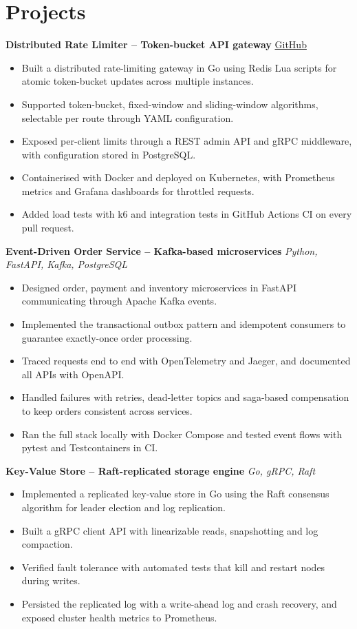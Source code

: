 \documentclass[10pt,a4paper]{article}
\begin{document}
\section*{Projects}
\textbf{Distributed Rate Limiter -- Token-bucket API gateway} \hfill \href{https://github.com/example/rate-limiter}{GitHub}
\begin{itemize}
    \item Built a distributed rate-limiting gateway in Go using Redis Lua scripts for atomic token-bucket updates across multiple instances.
    \item Supported token-bucket, fixed-window and sliding-window algorithms, selectable per route through YAML configuration.
    \item Exposed per-client limits through a REST admin API and gRPC middleware, with configuration stored in PostgreSQL.
    \item Containerised with Docker and deployed on Kubernetes, with Prometheus metrics and Grafana dashboards for throttled requests.
    \item Added load tests with k6 and integration tests in GitHub Actions CI on every pull request.
\end{itemize}

\textbf{Event-Driven Order Service -- Kafka-based microservices} \hfill \textit{Python, FastAPI, Kafka, PostgreSQL}
\begin{itemize}
    \item Designed order, payment and inventory microservices in FastAPI communicating through Apache Kafka events.
    \item Implemented the transactional outbox pattern and idempotent consumers to guarantee exactly-once order processing.
    \item Traced requests end to end with OpenTelemetry and Jaeger, and documented all APIs with OpenAPI.
    \item Handled failures with retries, dead-letter topics and saga-based compensation to keep orders consistent across services.
    \item Ran the full stack locally with Docker Compose and tested event flows with pytest and Testcontainers in CI.
\end{itemize}

\textbf{Key-Value Store -- Raft-replicated storage engine} \hfill \textit{Go, gRPC, Raft}
\begin{itemize}
    \item Implemented a replicated key-value store in Go using the Raft consensus algorithm for leader election and log replication.
    \item Built a gRPC client API with linearizable reads, snapshotting and log compaction.
    \item Verified fault tolerance with automated tests that kill and restart nodes during writes.
    \item Persisted the replicated log with a write-ahead log and crash recovery, and exposed cluster health metrics to Prometheus.
\end{itemize}
\end{document}
